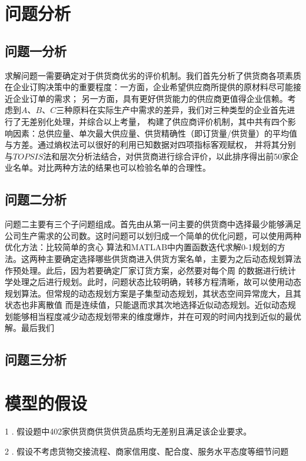 \documentclass{cumcmthesis}
\begin{document}
\section{问题分析}
\subsection{问题一分析}
求解问题一需要确定对于供货商优劣的评价机制。我们首先分析了供货商各项素质在企业订购决策中的重要程度：一方面，企业希望供应商所提供的原材料尽可能接近企业订单的需求；
另一方面，具有更好供货能力的供应商更值得企业信赖。考虑到$A$、$B$、$C$三种原料在实际生产中需求的差异，我们对三种类型的企业首先进行了无差别化处理，并综合以上考量，
构建了供应商评价机制，其中共有四个影响因素：总供应量、单次最大供应量、供货精确性（即订货量/供货量）的平均值与方差。通过熵权法可以很好的利用已知数据对四项指标客观赋权，
并将其分别与$TOPSIS$法和层次分析法结合，对供货商进行综合评价，以此排序得出前50家企业名单。对比两种方法的结果也可以检验名单的合理性。

\subsection{问题二分析}
问题二主要有三个子问题组成。首先由从第一问主要的供货商中选择最少能够满足公司生产需求的公司数。这时问题可以划归成一个简单的优化问题，可以使用两种优化方法：比较简单的贪心
算法和MATLAB中内置函数迭代求解0-1规划的方法。这两种主要确定选择哪些供货商进入供货方案名单，主要为之后动态规划算法作预处理。此后，因为若要确定厂家订货方案，必然要对每个周
的数据进行统计学处理之后进行规划。此时，问题状态比较明确，转移方程清晰，故可以使用动态规划算法。但常规的动态规划方案是子集型动态规划，其状态空间异常庞大，且其状态也非离散值
而是连续值，只能退而求其次地选择近似动态规划。近似动态规划能够相当程度减少动态规划带来的维度爆炸，并在可观的时间内找到近似的最优解。最后我们

\subsection{问题三分析}


\section{模型的假设}
1 . 假设题中402家供货商供货供货品质均无差别且满足该企业要求。

2 . 假设不考虑货物交接流程、商家信用度、配合度、服务水平态度等细节问题
\end{document}
